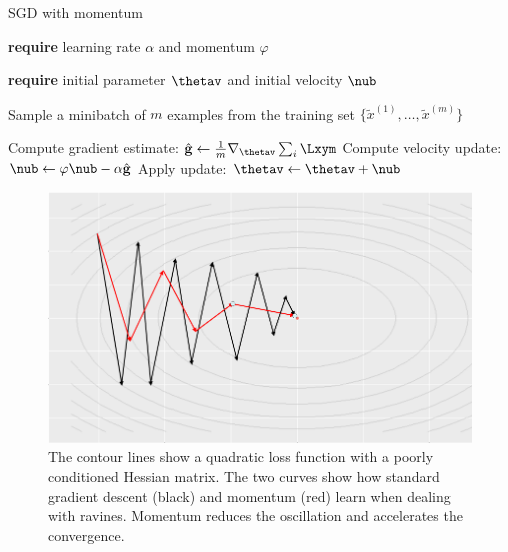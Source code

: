 \begin{vbframe}{SGD with momentum}
  \begin{algorithm}[H]
  \small
    \caption{Stochastic gradient descent with momentum}
    \begin{algorithmic}[1]
    \State \textbf{require} learning rate $\alpha$ and momentum $\varphi$ \strut
    \State \textbf{require} initial parameter $\thetav$ and initial velocity $\nub$ \strut
        \State \parbox[t]{\dimexpr\linewidth-\algorithmicindent}{Sample a minibatch of $m$ examples from the training set $\{\tilde{x}^{(1)},\dots,\tilde{x}^{(m)}\}$}
        \State Compute gradient estimate: $\hat{\mathbf{g}} \leftarrow  \frac{1}{m} \nabla_{\thetav} \sum_{i} \Lxym$
        \State Compute velocity update: $\nub \leftarrow \varphi \nub - \alpha \hat{\mathbf{g}}$
        \State Apply update: $\thetav \leftarrow \thetav + \nub$
      \EndWhile
    \end{algorithmic}
  \end{algorithm}
  
\framebreak
  
  \begin{figure}
  \captionsetup{font=footnotesize,labelfont=footnotesize, labelfont = bf}
  \centering
    \includegraphics[height = 6 cm, width = 10 cm]{figure/momentum.png}
    \caption{The contour lines show a quadratic loss function with a poorly conditioned Hessian matrix. The two curves show how standard gradient descent (black) and momentum (red) learn when dealing with ravines. Momentum reduces the oscillation and accelerates the convergence.}
  \end{figure}
\end{vbframe}

